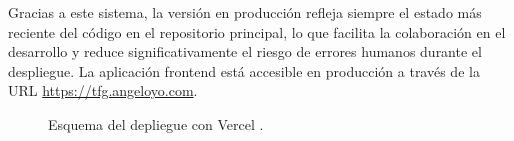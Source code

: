 Gracias a este sistema, la versión en producción refleja siempre el estado más reciente del código en el repositorio principal, lo que facilita la colaboración en el desarrollo y reduce significativamente el riesgo de errores humanos durante el despliegue. La aplicación frontend está accesible en producción a través de la URL \url{https://tfg.angeloyo.com}.


\begin{figure}[H]
  \centering
  \caption{Esquema del depliegue con Vercel \cite{cicdfoto}.}
  \label{fig:cicd}
\end{figure}
